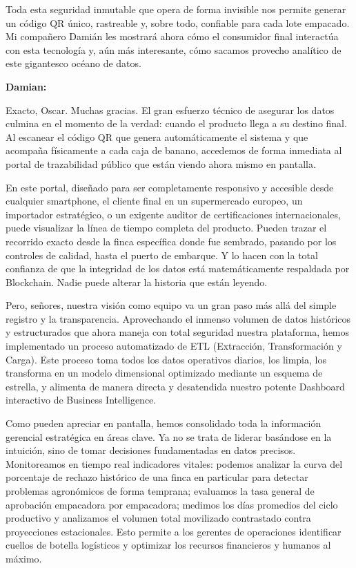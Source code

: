 \documentclass[12pt,a4paper]{article}
\begin{document}
Toda esta seguridad inmutable que opera de forma invisible nos permite generar un código QR único, rastreable y, sobre todo, confiable para cada lote empacado. Mi compañero Damián les mostrará ahora cómo el consumidor final interactúa con esta tecnología y, aún más interesante, cómo sacamos provecho analítico de este gigantesco océano de datos.

\textbf{Damian:}

Exacto, Oscar. Muchas gracias. El gran esfuerzo técnico de asegurar los datos culmina en el momento de la verdad: cuando el producto llega a su destino final. Al escanear el código QR que genera automáticamente el sistema y que acompaña físicamente a cada caja de banano, accedemos de forma inmediata al portal de trazabilidad público que están viendo ahora mismo en pantalla. 

En este portal, diseñado para ser completamente responsivo y accesible desde cualquier smartphone, el cliente final en un supermercado europeo, un importador estratégico, o un exigente auditor de certificaciones internacionales, puede visualizar la línea de tiempo completa del producto. Pueden trazar el recorrido exacto desde la finca específica donde fue sembrado, pasando por los controles de calidad, hasta el puerto de embarque. Y lo hacen con la total confianza de que la integridad de los datos está matemáticamente respaldada por Blockchain. Nadie puede alterar la historia que están leyendo.

Pero, señores, nuestra visión como equipo va un gran paso más allá del simple registro y la transparencia. Aprovechando el inmenso volumen de datos históricos y estructurados que ahora maneja con total seguridad nuestra plataforma, hemos implementado un proceso automatizado de ETL (Extracción, Transformación y Carga). Este proceso toma todos los datos operativos diarios, los limpia, los transforma en un modelo dimensional optimizado mediante un esquema de estrella, y alimenta de manera directa y desatendida nuestro potente Dashboard interactivo de Business Intelligence.

Como pueden apreciar en pantalla, hemos consolidado toda la información gerencial estratégica en áreas clave. Ya no se trata de liderar basándose en la intuición, sino de tomar decisiones fundamentadas en datos precisos. Monitoreamos en tiempo real indicadores vitales: podemos analizar la curva del porcentaje de rechazo histórico de una finca en particular para detectar problemas agronómicos de forma temprana; evaluamos la tasa general de aprobación empacadora por empacadora; medimos los días promedios del ciclo productivo y analizamos el volumen total movilizado contrastado contra proyecciones estacionales. Esto permite a los gerentes de operaciones identificar cuellos de botella logísticos y optimizar los recursos financieros y humanos al máximo.
\end{document}
